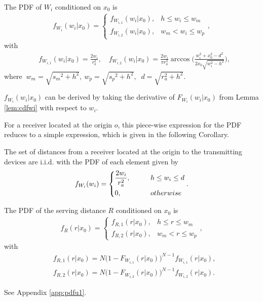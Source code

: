 \documentclass[journal,draftclsnofoot,onecolumn,12pt]{IEEEtran}
\begin{document}
\begin{lemma}\label{lem:pdfwi}
The PDF of $W_i$ conditioned on $x_0$ is  
\begin{align}
f_{W_i}(w_i | x_0) =  
\begin{cases}
	f_{W_{i,1}}(w_i | x_0 ), &     h \leq w_i \leq w_m \\
	f_{W_{i,2}}(w_i | x_0 ), &     w_m < w_i \leq w_p
\end{cases}
,
\end{align}
with 
\begin{align}
&f_{W_{i,1}}(w_i | x_0 ) = \frac{2 w_i}{r_a^2}, \quad f_{W_{i,2}}(w_i | x_0 ) = \frac{2 w_i}{\pi r_a^2}\arccos\bigg(\frac{w_i^2+x_0^2-d^2}{2 x_0 \sqrt{w_i^2-h^2} }\bigg), 
\end{align}
where $\ w_m = \sqrt{{s_m}^2 + h^2},\ w_p = \sqrt{{s_p}^2 + h^2},$  $\ d = \sqrt{r_a^2+h^2}.$%
\end{lemma}
\begin{IEEEproof}
$f_{W_i}(w_i|x_0)$ can be derived by taking the derivative of $F_{W_i}(w_i|x_0)$ from Lemma \ref{lem:cdfwi} with respect to $w_i$.
\end{IEEEproof}

For a receiver located at the origin $o$, this piece-wise expression for the PDF reduces to a simple expression, which is given in the following Corollary.
\begin{cor}
The set of distances from a receiver located at the origin to the transmitting devices are i.i.d. with the PDF of each element given by 
\begin{align}
f_{W_i}(w_i) = \begin{dcases}
\frac{2w_i}{r_a^2}, \qquad     &h \leq w_i \leq d \\
0, \qquad &otherwise
\end{dcases}.
\end{align}
\end{cor}

\begin{lemma}\label{lem:pdfu1}
The PDF of the serving distance $R$ conditioned on $x_0$ is  
\begin{align}\label{equ:pdfu1}
f_{R}(r | x_0) =  
\begin{cases}
	f_{R,1}(r | x_0 ), &     h \leq r \leq w_m \\
	f_{R,2}(r | x_0 ), &     w_m < r \leq w_p
\end{cases}
,
\end{align}
with 
\begin{align}
&f_{R,1}(r | x_0 ) =  N\big( 1 - F_{W_{i,1}}(r|x_0) \big)^{N-1}f_{W_{i,1}}(r|x_0), \\
&f_{R,2}(r | x_0 ) =  N\big( 1 - F_{W_{i,2}}(r|x_0) \big)^{N-1}f_{W_{i,2}}(r|x_0). 
\end{align}
\end{lemma}
\begin{IEEEproof}
See Appendix \ref{app:pdfu1}.
\end{IEEEproof}
\end{document}
